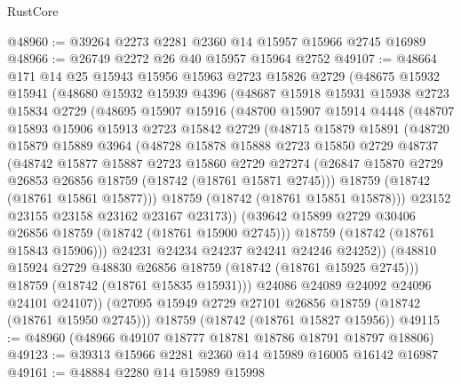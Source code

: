\begin{lexlean}{RustCore}
\begin{coremodule}
@48960 := @39264 @2273 @2281 @2360 @14 @15957 @15966 @2745 @16989
@48966 := @26749 @2272 @26 @40 @15957 @15964 @2752
@49107 := @48664
    @171
    @14
    @25
    @15943
    @15956
    @15963
    @2723
    @15826
    @2729
    (@48675
      @15932
      @15941
      (@48680
        @15932
        @15939
        @4396
        (@48687
          @15918
          @15931
          @15938
          @2723
          @15834
          @2729
          (@48695
            @15907
            @15916
            (@48700
              @15907
              @15914
              @4448
              (@48707
                @15893
                @15906
                @15913
                @2723
                @15842
                @2729
                (@48715
                  @15879
                  @15891
                  (@48720
                    @15879
                    @15889
                    @3964
                    (@48728
                      @15878
                      @15888
                      @2723
                      @15850
                      @2729
                      @48737
                      (@48742
                        @15877
                        @15887
                        @2723
                        @15860
                        @2729
                        @27274
                        (@26847 @15870 @2729 @26853 @26856 @18759 (@18742 (@18761 @15871 @2745)))
                        @18759
                        (@18742 (@18761 @15861 @15877)))
                      @18759
                      (@18742 (@18761 @15851 @15878)))
                    @23152
                    @23155
                    @23158
                    @23162
                    @23167
                    @23173))
                (@39642 @15899 @2729 @30406 @26856 @18759 (@18742 (@18761 @15900 @2745)))
                @18759
                (@18742 (@18761 @15843 @15906)))
              @24231
              @24234
              @24237
              @24241
              @24246
              @24252))
          (@48810 @15924 @2729 @48830 @26856 @18759 (@18742 (@18761 @15925 @2745)))
          @18759
          (@18742 (@18761 @15835 @15931)))
        @24086
        @24089
        @24092
        @24096
        @24101
        @24107))
    (@27095 @15949 @2729 @27101 @26856 @18759 (@18742 (@18761 @15950 @2745)))
    @18759
    (@18742 (@18761 @15827 @15956))
@49115 := @48960 (@48966 @49107 @18777 @18781 @18786 @18791 @18797 @18806)
@49123 := @39313 @15966 @2281 @2360 @14 @15989 @16005 @16142 @16987
@49161 := @48884
    @2280
    @14
    @15989
    @15998

\end{coremodule}
\end{lexlean}
